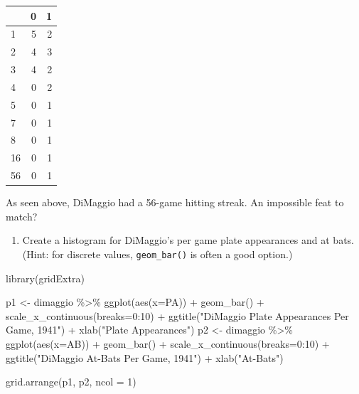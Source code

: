 \documentclass[
  11pt,
]{book}
\newenvironment{Shaded}{\begin{snugshade}}{\end{snugshade}}
\newcommand{\AttributeTok}[1]{\textcolor[rgb]{0.77,0.63,0.00}{#1}}
\newcommand{\DecValTok}[1]{\textcolor[rgb]{0.00,0.00,0.81}{#1}}
\newcommand{\FunctionTok}[1]{\textcolor[rgb]{0.00,0.00,0.00}{#1}}
\newcommand{\NormalTok}[1]{#1}
\newcommand{\OtherTok}[1]{\textcolor[rgb]{0.56,0.35,0.01}{#1}}
\newcommand{\SpecialCharTok}[1]{\textcolor[rgb]{0.00,0.00,0.00}{#1}}
\newcommand{\StringTok}[1]{\textcolor[rgb]{0.31,0.60,0.02}{#1}}
\providecommand{\tightlist}{%
  \setlength{\itemsep}{0pt}\setlength{\parskip}{0pt}}
\theoremstyle{definition}
\theoremstyle{definition}
\theoremstyle{definition}
\theoremstyle{definition}
\theoremstyle{remark}
\begin{document}
\begin{table}[H]
\centering
\begin{tabular}{lrr}
\toprule
  & 0 & 1\\
\midrule
1 & 5 & 2\\
2 & 4 & 3\\
3 & 4 & 2\\
4 & 0 & 2\\
5 & 0 & 1\\
7 & 0 & 1\\
8 & 0 & 1\\
16 & 0 & 1\\
56 & 0 & 1\\
\bottomrule
\end{tabular}
\end{table}

As seen above, DiMaggio had a 56-game hitting streak. An impossible feat to match?

\vfill
\newpage

\begin{enumerate}
\def\labelenumi{(\alph{enumi})}
\tightlist
\item
  Create a histogram for DiMaggio's per game plate appearances and at bats. (Hint: for discrete values, \texttt{geom\_bar()} is often a good option.)
\end{enumerate}

\begin{Shaded}
\begin{Highlighting}[]
\FunctionTok{library}\NormalTok{(gridExtra)}

\NormalTok{p1 }\OtherTok{\textless{}{-}}\NormalTok{ dimaggio }\SpecialCharTok{\%\textgreater{}\%} 
  \FunctionTok{ggplot}\NormalTok{(}\FunctionTok{aes}\NormalTok{(}\AttributeTok{x=}\NormalTok{PA)) }\SpecialCharTok{+} 
  \FunctionTok{geom\_bar}\NormalTok{() }\SpecialCharTok{+} 
  \FunctionTok{scale\_x\_continuous}\NormalTok{(}\AttributeTok{breaks=}\DecValTok{0}\SpecialCharTok{:}\DecValTok{10}\NormalTok{) }\SpecialCharTok{+} 
  \FunctionTok{ggtitle}\NormalTok{(}\StringTok{"DiMaggio Plate Appearances Per Game, 1941"}\NormalTok{) }\SpecialCharTok{+}
  \FunctionTok{xlab}\NormalTok{(}\StringTok{"Plate Appearances"}\NormalTok{)}
\NormalTok{p2 }\OtherTok{\textless{}{-}}\NormalTok{ dimaggio }\SpecialCharTok{\%\textgreater{}\%} 
  \FunctionTok{ggplot}\NormalTok{(}\FunctionTok{aes}\NormalTok{(}\AttributeTok{x=}\NormalTok{AB)) }\SpecialCharTok{+} 
  \FunctionTok{geom\_bar}\NormalTok{() }\SpecialCharTok{+} 
  \FunctionTok{scale\_x\_continuous}\NormalTok{(}\AttributeTok{breaks=}\DecValTok{0}\SpecialCharTok{:}\DecValTok{10}\NormalTok{) }\SpecialCharTok{+} 
  \FunctionTok{ggtitle}\NormalTok{(}\StringTok{"DiMaggio At{-}Bats Per Game, 1941"}\NormalTok{) }\SpecialCharTok{+}
  \FunctionTok{xlab}\NormalTok{(}\StringTok{"At{-}Bats"}\NormalTok{)}

\FunctionTok{grid.arrange}\NormalTok{(p1, p2, }\AttributeTok{ncol =} \DecValTok{1}\NormalTok{)}
\end{Highlighting}
\end{Shaded}
\end{document}

